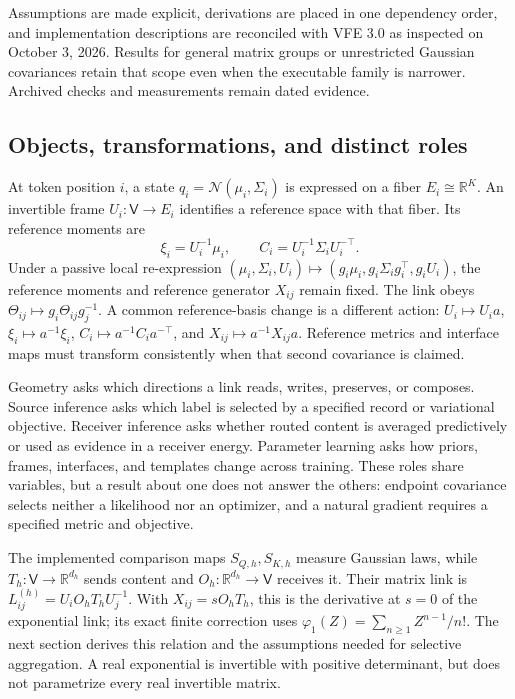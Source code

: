 \documentclass[11pt]{article}
\theoremstyle{definition}
\theoremstyle{remark}
\begin{document}
Assumptions are made explicit, derivations are placed in one dependency order, and implementation descriptions are reconciled with VFE 3.0 as inspected on October 3, 2026. Results for general matrix groups or unrestricted Gaussian covariances retain that scope even when the executable family is narrower. Archived checks and measurements remain dated evidence.

\subsection{Objects, transformations, and distinct roles}
\label{unified:objects}

At token position $i$, a state $q_i=\mathcal N(\mu_i,\Sigma_i)$ is expressed on a fiber $E_i\cong\mathbb R^K$. An invertible frame $U_i:\mathsf V\to E_i$ identifies a reference space with that fiber. Its reference moments are
\begin{equation}
\xi_i=U_i^{-1}\mu_i, \qquad C_i=U_i^{-1}\Sigma_iU_i^{-\top}.
\label{unified:reference_moments}
\end{equation}
Under a passive local re-expression $(\mu_i,\Sigma_i,U_i)\mapsto(g_i\mu_i,g_i\Sigma_i g_i^\top,g_iU_i)$, the reference moments and reference generator $X_{ij}$ remain fixed. The link obeys $\Theta_{ij}\mapsto g_i\Theta_{ij}g_j^{-1}$. A common reference-basis change is a different action: $U_i\mapsto U_i a$, $\xi_i\mapsto a^{-1}\xi_i$, $C_i\mapsto a^{-1}C_i a^{-\top}$, and $X_{ij}\mapsto a^{-1}X_{ij}a$. Reference metrics and interface maps must transform consistently when that second covariance is claimed.

Geometry asks which directions a link reads, writes, preserves, or composes. Source inference asks which label is selected by a specified record or variational objective. Receiver inference asks whether routed content is averaged predictively or used as evidence in a receiver energy. Parameter learning asks how priors, frames, interfaces, and templates change across training. These roles share variables, but a result about one does not answer the others: endpoint covariance selects neither a likelihood nor an optimizer, and a natural gradient requires a specified metric and objective.

The implemented comparison maps $S_{Q,h},S_{K,h}$ measure Gaussian laws, while $T_h:\mathsf V\to\mathbb R^{d_h}$ sends content and $O_h:\mathbb R^{d_h}\to\mathsf V$ receives it. Their matrix link is $L_{ij}^{(h)}=U_iO_hT_hU_j^{-1}$. With $X_{ij}=sO_hT_h$, this is the derivative at $s=0$ of the exponential link; its exact finite correction uses $\varphi_1(Z)=\sum_{n\ge1}Z^{n-1}/n!$. The next section derives this relation and the assumptions needed for selective aggregation. A real exponential is invertible with positive determinant, but does not parametrize every real invertible matrix.
\end{document}
